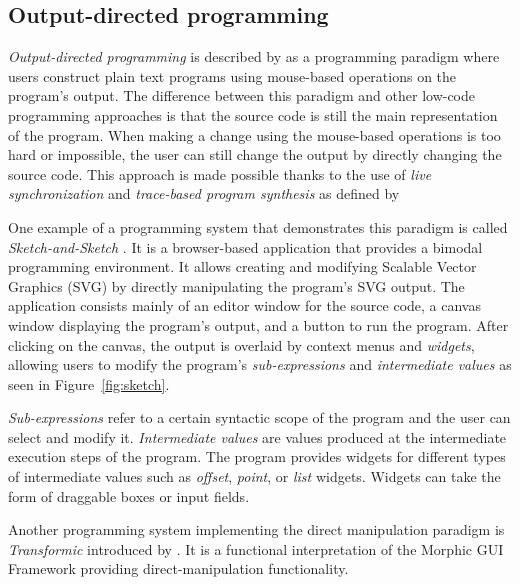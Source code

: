 \subsection{Output-directed programming}
\label{sec:odp}
\emph{Output-directed programming} is described by \citet{sketch-and-sketch} as
a programming paradigm where users construct plain text programs using mouse-based operations on the program's output.
The difference between this paradigm and other low-code programming approaches is that the source code is still the main representation of the program.
When making a change using the mouse-based operations is too hard or impossible, the user
can still change the output by directly changing the source code.
This approach is made possible thanks to the use of \emph{live synchronization} and \emph{trace-based program synthesis} as defined by \citet{output-directed-programming}

One example of a programming system that demonstrates this paradigm is called \emph{Sketch-and-Sketch} \cite{sketch-and-sketch,output-directed-programming}.
It is a browser-based application that provides a bimodal programming environment. It allows creating and modifying Scalable Vector Graphics (SVG) by directly manipulating the program's SVG output.
The application consists mainly of an editor window for the source code, a canvas window displaying the program's output, and a button to run the program.
After clicking on the canvas, the output is overlaid by context menus and \emph{widgets}, allowing users to modify the program's \emph{sub-expressions} and \emph{intermediate values} as seen in Figure~\ref{fig:sketch}.


\emph{Sub-expressions} refer to a certain syntactic scope of the program and the user can select and modify it.
\emph{Intermediate values} are values produced at the intermediate execution steps of the program.
The program provides widgets for different types of intermediate values such as \emph{offset}, \emph{point}, or \emph{list} widgets.
Widgets can take the form of draggable boxes or input fields.


Another programming system implementing the direct manipulation paradigm is \emph{Transformic} introduced by \citet{Schreiber_Krahn_Ingalls_Hirschfeld_2017}.
It is a functional interpretation of the Morphic GUI Framework providing direct-manipulation functionality.

